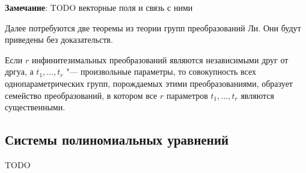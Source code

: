 \documentclass[../main.tex]{subfiles}
\begin{document}
\textbf{Замечание}: TODO векторные поля и связь с ними

Далее потребуются две теоремы из теории групп преобразований Ли. Они будут приведены без доказательств.
\begin{theorem}
Если $r$ инфинитезимальных преобразований являются независимыми друг от дргуа, а $t_1,\hdots,t_r$ "--- произвольные параметры, то совокупность всех однопараметрических групп, порождаемых этими преобразованиями, образует семейство преобразований, в котором все $r$  параметров $t_1,\hdots,t_r$ являются существенными.
\end{theorem}

\subsection{Системы полиномиальных уравнений}
TODO
\end{document}
